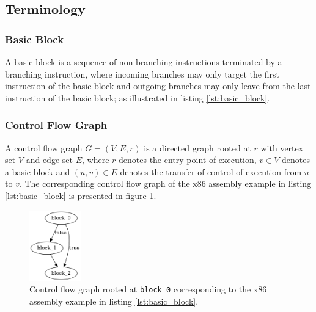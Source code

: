 
\subsection{Terminology}


\subsubsection{Basic Block}

A basic block is a sequence of non-branching instructions terminated by a branching instruction, where incoming branches may only target the first instruction of the basic block and outgoing branches may only leave from the last instruction of the basic block; as illustrated in listing \ref{lst:basic_block}.




\subsubsection{Control Flow Graph}

A control flow graph $G = (V, E, r)$ is a directed graph rooted at $r$ with vertex set $V$ and edge set $E$, where $r$ denotes the entry point of execution, $v \in V$ denotes a basic block and $(u, v) \in E$ denotes the transfer of control of execution from $u$ to $v$. The corresponding control flow graph of the x86 assembly example in listing \ref{lst:basic_block} is presented in figure \ref{fig:control_flow_graph}.

\begin{figure}[htbp]
	\centering
	\includegraphics[width=0.2\textwidth]{inc/appendices/vocabulary/control_flow_graph.png}
	\caption{Control flow graph rooted at \texttt{block\_0} corresponding to the x86 assembly example in listing \ref{lst:basic_block}.}
	\label{fig:control_flow_graph}
\end{figure}

